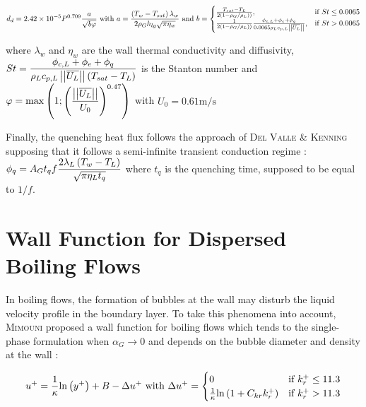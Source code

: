 \begin{equation}
\label{eq:unal}
d_{d}=2.42\times 10^{-5} P^{0.709} \frac{a}{\sqrt{b\varphi}}\text{ with } a=\frac{\parth{T_{w}-T_{sat}} \lambda_{w}}{2\rho_{G}h_{lg}\sqrt{\pi\eta_{w}}} \text{ and } 
  b=\begin{cases}
    \frac{T_{sat}-T_{L}}{2 \parth{1-\rho_{G}/\rho_{L} })}, & \text{if $St\leq0.0065$}\\
    \frac{1}{2 \parth{1-\rho_{G}/\rho_{L} })}\frac{\phi_{c,L}+\phi_{e}+\phi_{q}}{0.0065\rho_{L}c_{p,L}\norm{\vect{U_{L}}}}, & \text{\text{if $St>0.0065$}}
  \end{cases}
\end{equation}

where $\lambda_{w}$ and $\eta_{w}$ are the wall thermal conductivity and diffusivity, $St=\displaystyle \frac{\phi_{c,L}+\phi_{e}+\phi_{q}}{\rho_{L}c_{p,L}\left|\left|{\overline{U_{L}}}\right|\right|\left( T_{sat}-T_{L}  \right)}$ is the Stanton number and $\varphi=\displaystyle \mathrm{max}\left( 1 ; \left( \frac{\left|\left|{\overline{U_{L}}}\right|\right|}{U_{0}}  \right)^{0.47}  \right)$ with $U_{0}=0.61\text{m/s}$

Finally, the quenching heat flux follows the approach of \textsc{Del Valle} \& \textsc{Kenning}\cite{DelValle1985} supposing that it follows a semi-infinite transient conduction regime : $\displaystyle \phi_{q}=A_{G}t_{q}f\frac{2\lambda_{L} \left( T_{w}-T_{L} \right)}{\sqrt{\pi \eta_{L}t_{q}}}$ where $t_{q}$ is the quenching time, supposed to be equal to $1/f$.

\section{Wall Function for Dispersed Boiling Flows}
\label{subsec:wall_func}

In boiling flows, the formation of bubbles at the wall may disturb the liquid velocity profile in the boundary layer. To take this phenomena into account, \textsc{Mimouni} \etal\cite{Mimouni2016} proposed a wall function for boiling flows which tends to the single-phase formulation when $\alpha_{G} \rightarrow 0$ and depends on the bubble diameter and density at the wall : 

\begin{equation}
\label{eq:wall_law}
u^{+}=\frac{1}{\kappa}\ln{ y^{+} } + B - \Delta u^{+} \text{ with } 
  \Delta u^{+}=\begin{cases}
    0 & \text{if $k_{r}^{+}\leq11.3$}\\
    \frac{1}{\kappa}\ln{ 1+ C_{kr}k_{r}^{+} } & \text{\text{if $k_{r}^{+}>11.3$}}
  \end{cases}
\end{equation}

